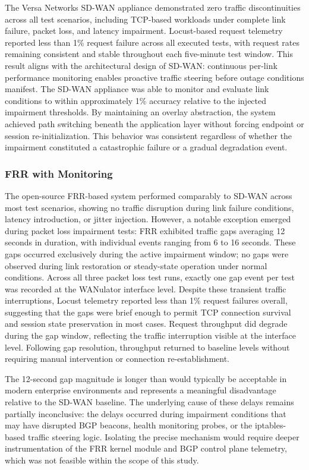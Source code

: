 \documentclass[conference]{IEEEtran}
\begin{document}
The Versa Networks SD-WAN appliance demonstrated zero traffic discontinuities across all test scenarios, including TCP-based workloads under complete link failure, packet loss, and latency impairment. Locust-based request telemetry reported less than 1\% request failure across all executed tests, with request rates remaining consistent and stable throughout each five-minute test window. This result aligns with the architectural design of SD-WAN: continuous per-link performance monitoring enables proactive traffic steering before outage conditions manifest. The SD-WAN appliance was able to monitor and evaluate link conditions to within approximately 1\% accuracy relative to the injected impairment thresholds. By maintaining an overlay abstraction, the system achieved path switching beneath the application layer without forcing endpoint or session re-initialization. This behavior was consistent regardless of whether the impairment constituted a catastrophic failure or a gradual degradation event.

\subsubsection{FRR with Monitoring}

The open-source FRR-based system performed comparably to SD-WAN across most test scenarios, showing no traffic disruption during link failure conditions, latency introduction, or jitter injection. However, a notable exception emerged during packet loss impairment tests: FRR exhibited traffic gaps averaging 12 seconds in duration, with individual events ranging from 6 to 16 seconds. These gaps occurred exclusively during the active impairment window; no gaps were observed during link restoration or steady-state operation under normal conditions. Across all three packet loss test runs, exactly one gap event per test was recorded at the WANulator interface level. Despite these transient traffic interruptions, Locust telemetry reported less than 1\% request failures overall, suggesting that the gaps were brief enough to permit TCP connection survival and session state preservation in most cases. Request throughput did degrade during the gap window, reflecting the traffic interruption visible at the interface level. Following gap resolution, throughput returned to baseline levels without requiring manual intervention or connection re-establishment. 

The 12-second gap magnitude is longer than would typically be acceptable in modern enterprise environments and represents a meaningful disadvantage relative to the SD-WAN baseline. The underlying cause of these delays remains partially inconclusive: the delays occurred during impairment conditions that may have disrupted BGP beacons, health monitoring probes, or the iptables-based traffic steering logic. Isolating the precise mechanism would require deeper instrumentation of the FRR kernel module and BGP control plane telemetry, which was not feasible within the scope of this study.
\end{document}
